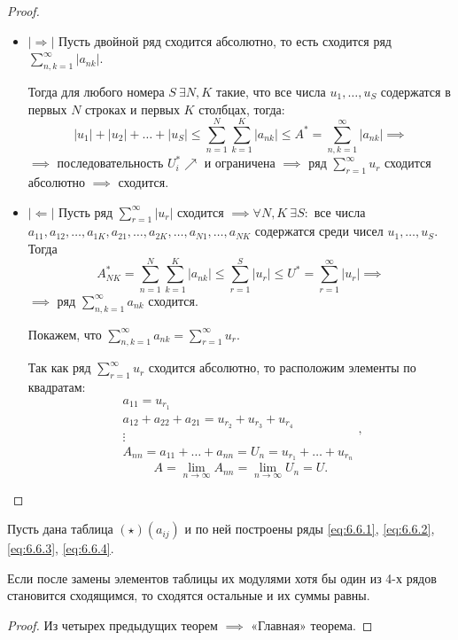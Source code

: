 \begin{proof}\leavevmode
    \begin{itemize}
        \item $ |\Rightarrow| $ Пусть двойной ряд сходится абсолютно, то есть сходится ряд $\sum_{n,k=1}^{\infty}|a_{nk}|$.

              Тогда для любого номера $S \ \exists N,K$ такие, что все числа $u_1,\ldots,u_S$ содержатся в первых $N$ строках и первых $K$ столбцах, тогда:
              \[
                |u_1| + |u_2| + \ldots + |u_S| \leqslant \sum_{n=1}^{N}\sum_{k=1}^{K}|a_{nk}| \leqslant A^* = \sum_{n,k=1}^{\infty}|a_{nk}| \implies
              \]
              $\implies$ последовательность $U_i^* \nearrow$ и ограничена $\implies$ ряд $\sum_{r=1}^{\infty}u_r$ сходится абсолютно $\implies$ сходится.

        \item $ |\Leftarrow| $ Пусть ряд $\sum_{r=1}^{\infty}|u_r|$ сходится $\implies \forall N,K \ \exists S:$ все числа $a_{11},a_{12},\ldots,a_{1K},a_{21},\ldots,a_{2K},\ldots,a_{N1},\ldots,a_{NK}$ содержатся среди чисел $u_1,\ldots,u_S$. Тогда
              \[
                A_{NK}^* = \sum_{n=1}^{N}\sum_{k=1}^{K}|a_{nk}| \leqslant\sum_{r=1}^{S}|u_r| \leqslant U^* = \sum_{r=1}^{\infty}|u_r| \implies
              \]
              $\implies$ ряд $\sum_{n,k=1}^{\infty}a_{nk}$ сходится.

              Покажем, что $\sum_{n,k=1}^{\infty}a_{nk} = \sum_{r=1}^{\infty}u_r$.

              Так как ряд $\sum_{r=1}^{\infty}u_r$ сходится абсолютно, то расположим элементы по квадратам:
              \[
                \begin{array}{l}
                    a_{11} = u_{r_1}                                       \\
                    a_{12} + a_{22} + a_{21} = u_{r_2} + u_{r_3} + u_{r_4} \\
                    \vdots                                                 \\
                    A_{nn} = a_{11} + \ldots + a_{nn} = U_n = u_{r_1} + \ldots + u_{r_n}
                \end{array},
              \]
              \[
                A = \underset{n\rightarrow\infty}{\lim}A_{nn} = \underset{n\rightarrow\infty}{\lim}U_n = U.
              \]
    \end{itemize}
\end{proof}

\begin{theorem}[«Главная»]
    Пусть дана таблица $ (\star)(a_{ij}) $ и по ней построены ряды \ref{eq:6.6.1}, \ref{eq:6.6.2}, \ref{eq:6.6.3}, \ref{eq:6.6.4}.

    Если после замены элементов таблицы их модулями хотя бы один из 4-х рядов становится сходящимся, то сходятся остальные и их суммы равны.
\end{theorem}

\begin{proof}
    Из четырех предыдущих теорем $\implies$ «Главная» теорема.
\end{proof}